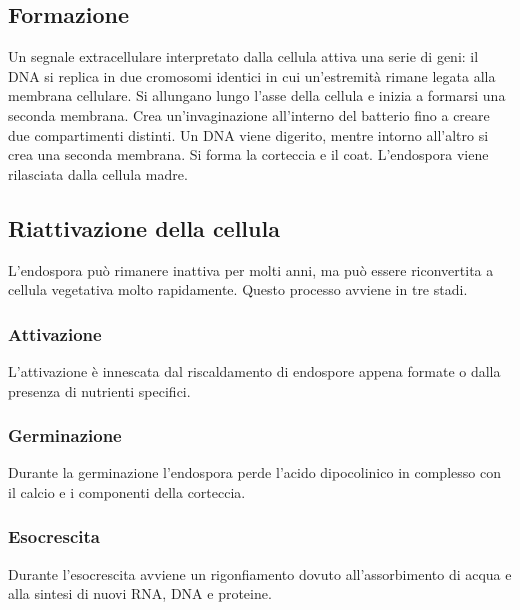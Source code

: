 	\subsection{Formazione}
	Un segnale extracellulare interpretato dalla cellula attiva una serie di geni: il DNA si replica in due cromosomi identici in cui un'estremit\`a rimane legata alla membrana cellulare.
	Si allungano lungo l'asse della cellula e inizia a formarsi una seconda membrana.
	Crea un'invaginazione all'interno del batterio fino a creare due compartimenti distinti.
	Un DNA viene digerito, mentre intorno all'altro si crea una seconda membrana.
	Si forma la corteccia e il coat.
	L'endospora viene rilasciata dalla cellula madre.

	\subsection{Riattivazione della cellula}
	L'endospora pu\`o rimanere inattiva per molti anni, ma pu\`o essere riconvertita a cellula vegetativa molto rapidamente.
	Questo processo avviene in tre stadi.

		\subsubsection{Attivazione}
		L'attivazione \`e innescata dal riscaldamento di endospore appena formate o dalla presenza di nutrienti specifici.

		\subsubsection{Germinazione}
		Durante la germinazione l'endospora perde l'acido dipocolinico in complesso con il calcio e i componenti della corteccia.

		\subsubsection{Esocrescita}
		Durante l'esocrescita avviene un rigonfiamento dovuto all'assorbimento di acqua e alla sintesi di nuovi RNA, DNA e proteine.
